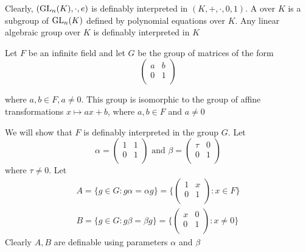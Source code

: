 \documentclass[11pt]{article}
\begin{document}
Clearly, \((\text{GL}_n(K),\cdot,e)\) is definably interpreted in \((K,+,\cdot,0,1)\).
A  over \(K\) is a subgroup of \(\text{GL}_n(K)\) defined by
polynomial equations over \(K\). Any linear algebraic group over \(K\) is
definably interpreted in \(K\)

Let \(F\) be an infinite field and let \(G\) be the group of matrices of the form 
\[
\begin{pmatrix}
 a & b \\
 0 & 1 \\
\end{pmatrix}
\]

where \(a,b\in F, a\neq 0\). This group is isomorphic to the group of affine
transformations \(x\mapsto ax+b\), where \(a,b\in F\) and \(a\neq 0\)

We will show that \(F\) is definably interpreted in the group \(G\). Let
\begin{equation*}
 \alpha=\begin{pmatrix}
        1&1\\
        0&1\\
        \end{pmatrix}\text{ and }
\beta=\begin{pmatrix}
\tau&0\\
0&1\\
      \end{pmatrix}
\end{equation*}
where \(\tau\neq 0\). Let
\begin{gather*}
A=\{g\in G:g\alpha=\alpha g\}=\{\begin{pmatrix}
1&x\\
0&1\\
                                \end{pmatrix}:x\in F\}\\
B=\{g\in G:g\beta=\beta g\}=\{\begin{pmatrix}
x&0\\
0&1\\
                                \end{pmatrix}:x\neq 0\}
\end{gather*}
Clearly \(A,B\) are definable using parameters \(\alpha\) and \(\beta\)
\end{document}
